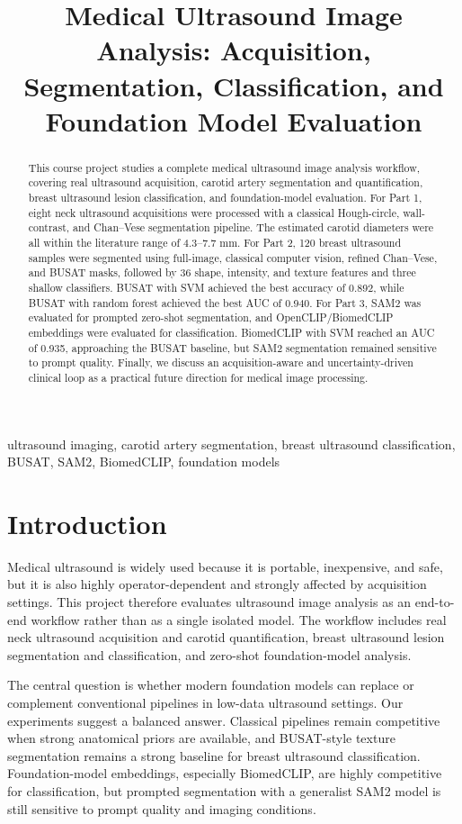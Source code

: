 \documentclass[conference]{IEEEtran}
\title{Medical Ultrasound Image Analysis: Acquisition, Segmentation, Classification, and Foundation Model Evaluation}
\author{}
\begin{document}
\maketitle

\begin{abstract}
This course project studies a complete medical ultrasound image analysis workflow, covering real ultrasound acquisition, carotid artery segmentation and quantification, breast ultrasound lesion classification, and foundation-model evaluation. For Part 1, eight neck ultrasound acquisitions were processed with a classical Hough-circle, wall-contrast, and Chan--Vese segmentation pipeline. The estimated carotid diameters were all within the literature range of 4.3--7.7 mm. For Part 2, 120 breast ultrasound samples were segmented using full-image, classical computer vision, refined Chan--Vese, and BUSAT masks, followed by 36 shape, intensity, and texture features and three shallow classifiers. BUSAT with SVM achieved the best accuracy of 0.892, while BUSAT with random forest achieved the best AUC of 0.940. For Part 3, SAM2 was evaluated for prompted zero-shot segmentation, and OpenCLIP/BiomedCLIP embeddings were evaluated for classification. BiomedCLIP with SVM reached an AUC of 0.935, approaching the BUSAT baseline, but SAM2 segmentation remained sensitive to prompt quality. Finally, we discuss an acquisition-aware and uncertainty-driven clinical loop as a practical future direction for medical image processing.
\end{abstract}

\begin{IEEEkeywords}
ultrasound imaging, carotid artery segmentation, breast ultrasound classification, BUSAT, SAM2, BiomedCLIP, foundation models
\end{IEEEkeywords}

\section{Introduction}
Medical ultrasound is widely used because it is portable, inexpensive, and safe, but it is also highly operator-dependent and strongly affected by acquisition settings. This project therefore evaluates ultrasound image analysis as an end-to-end workflow rather than as a single isolated model. The workflow includes real neck ultrasound acquisition and carotid quantification, breast ultrasound lesion segmentation and classification, and zero-shot foundation-model analysis.

The central question is whether modern foundation models can replace or complement conventional pipelines in low-data ultrasound settings. Our experiments suggest a balanced answer. Classical pipelines remain competitive when strong anatomical priors are available, and BUSAT-style texture segmentation remains a strong baseline for breast ultrasound classification. Foundation-model embeddings, especially BiomedCLIP, are highly competitive for classification, but prompted segmentation with a generalist SAM2 model is still sensitive to prompt quality and imaging conditions.
\end{document}
